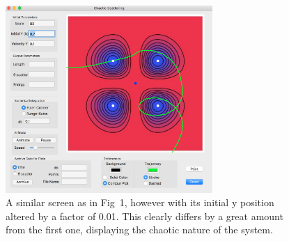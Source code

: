 \documentclass{article}
\begin{document}
{\begin{figure}[h]
	\centering
	\includegraphics[width=0.7\textwidth]{image2.png}
	\caption{A similar screen as in Fig~1, however with its initial y position altered by a factor of 0.01. This clearly differs by a great amount from the first one, displaying the chaotic nature of the system. }
	\label{fig:chaos2}
\end{figure}








}


 
\end{document}
